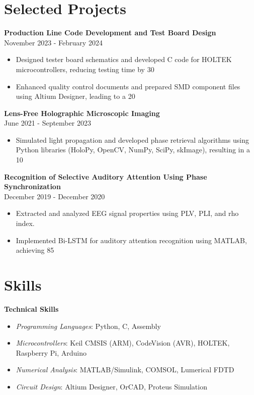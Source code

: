\documentclass[a4paper,10pt]{article}
\begin{document}
\section{Selected Projects}
\textbf{Production Line Code Development and Test Board Design} \\
November 2023 - February 2024 \\
\begin{itemize}[noitemsep,topsep=0pt,parsep=0pt,partopsep=0pt]
    \item Designed tester board schematics and developed C code for HOLTEK microcontrollers, reducing testing time by 30%
    \item Enhanced quality control documents and prepared SMD component files using Altium Designer, leading to a 20%
\end{itemize}

\textbf{Lens-Free Holographic Microscopic Imaging} \\
June 2021 - September 2023 \\
\begin{itemize}[noitemsep,topsep=0pt,parsep=0pt,partopsep=0pt]
    \item Simulated light propagation and developed phase retrieval algorithms using Python libraries (HoloPy, OpenCV, NumPy, SciPy, skImage), resulting in a 10%
\end{itemize}

\textbf{Recognition of Selective Auditory Attention Using Phase Synchronization} \\
December 2019 - December 2020 \\
\begin{itemize}[noitemsep,topsep=0pt,parsep=0pt,partopsep=0pt]
    \item Extracted and analyzed EEG signal properties using PLV, PLI, and rho index.
    \item Implemented Bi-LSTM for auditory attention recognition using MATLAB, achieving 85%
\end{itemize}

\section{Skills}
\textbf{Technical Skills}
\begin{itemize}[noitemsep,topsep=0pt,parsep=0pt,partopsep=0pt]
    \item \textit{Programming Languages}: Python, C, Assembly
    \item \textit{Microcontrollers}: Keil CMSIS (ARM), CodeVision (AVR), HOLTEK, Raspberry Pi, Arduino
    \item \textit{Numerical Analysis}: MATLAB/Simulink, COMSOL, Lumerical FDTD
    \item \textit{Circuit Design}: Altium Designer, OrCAD, Proteus Simulation
\end{itemize}
\end{document}
